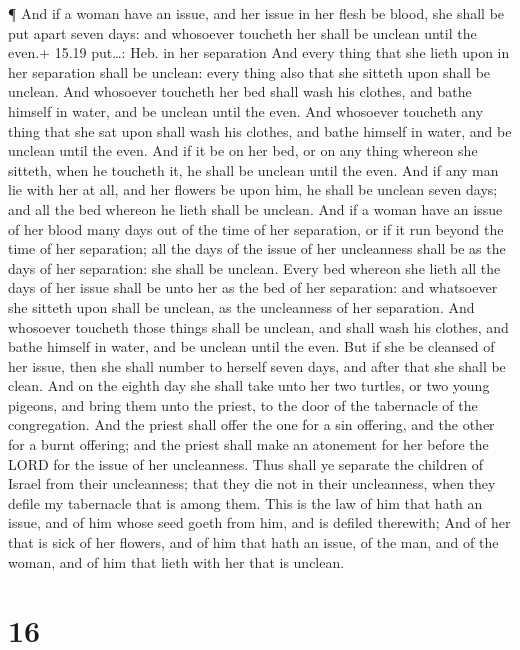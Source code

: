  ¶ And if a woman have an issue, and her issue in her flesh
be blood, she shall be put apart seven days: and whosoever toucheth her
shall be unclean until the even.+ 15.19 put\ldots: Heb. in her
separation  And every thing that she lieth upon in her
separation shall be unclean: every thing also that she sitteth upon
shall be unclean.  And whosoever toucheth her bed shall
wash his clothes, and bathe himself in water, and be unclean until the
even.  And whosoever toucheth any thing that she sat upon
shall wash his clothes, and bathe himself in water, and be unclean until
the even.  And if it be on her bed, or on any thing whereon
she sitteth, when he toucheth it, he shall be unclean until the even.
 And if any man lie with her at all, and her flowers be
upon him, he shall be unclean seven days; and all the bed whereon he
lieth shall be unclean.  And if a woman have an issue of
her blood many days out of the time of her separation, or if it run
beyond the time of her separation; all the days of the issue of her
uncleanness shall be as the days of her separation: she shall be
unclean.  Every bed whereon she lieth all the days of her
issue shall be unto her as the bed of her separation: and whatsoever she
sitteth upon shall be unclean, as the uncleanness of her separation.
 And whosoever toucheth those things shall be unclean, and
shall wash his clothes, and bathe himself in water, and be unclean until
the even.  But if she be cleansed of her issue, then she
shall number to herself seven days, and after that she shall be clean.
 And on the eighth day she shall take unto her two turtles,
or two young pigeons, and bring them unto the priest, to the door of the
tabernacle of the congregation.  And the priest shall offer
the one for a sin offering, and the other for a burnt offering; and the
priest shall make an atonement for her before the LORD for the issue of
her uncleanness.  Thus shall ye separate the children of
Israel from their uncleanness; that they die not in their uncleanness,
when they defile my tabernacle that is among them.  This is
the law of him that hath an issue, and of him whose seed goeth from him,
and is defiled therewith;  And of her that is sick of her
flowers, and of him that hath an issue, of the man, and of the woman,
and of him that lieth with her that is unclean.

\hypertarget{section-15}{%
\section{16}\label{section-15}}

